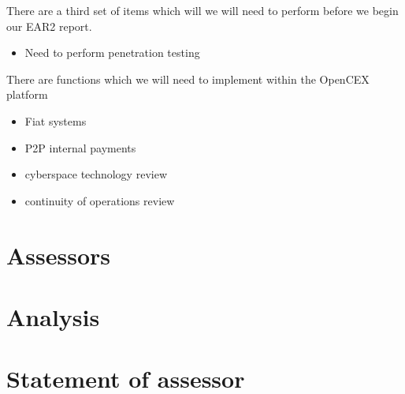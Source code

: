 \documentclass[]{report}
\begin{document}
There are a third set of items which will we will need to perform
before we begin our EAR2 report.

\begin{itemize}
\item Need to perform penetration testing
\end{itemize}

There are functions which we will need to implement within the
OpenCEX platform
\begin{itemize}
\item Fiat systems
\item P2P internal payments
\end{itemize}


\begin{itemize}
\item cyberspace technology review
\item continuity of operations review
\end{itemize}

\section{Assessors}


\section{Analysis}

\section{Statement of assessor}

\end{document}
